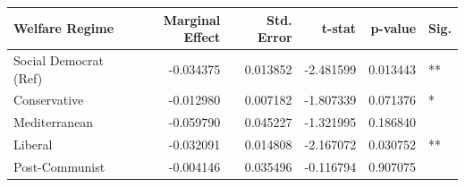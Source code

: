 \begin{tabular}{lrrrrl}
\toprule
Welfare Regime & Marginal Effect & Std. Error & t-stat & p-value & Sig. \\
\midrule
Social Democrat (Ref) & -0.034375 & 0.013852 & -2.481599 & 0.013443 & ** \\
Conservative & -0.012980 & 0.007182 & -1.807339 & 0.071376 & * \\
Mediterranean & -0.059790 & 0.045227 & -1.321995 & 0.186840 &  \\
Liberal & -0.032091 & 0.014808 & -2.167072 & 0.030752 & ** \\
Post-Communist & -0.004146 & 0.035496 & -0.116794 & 0.907075 &  \\
\bottomrule
\end{tabular}
